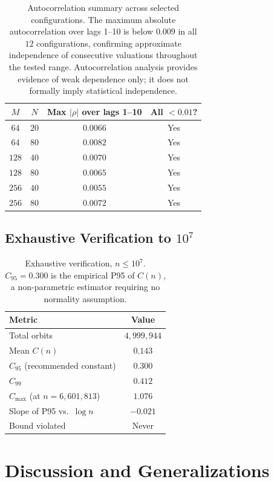 \documentclass[12pt]{article}
\theoremstyle{definition}
\theoremstyle{remark}
\begin{document}
\begin{table}[h]
\centering
\begin{tabular}{cccc}\toprule
$M$&$N$&Max $|\rho|$ over lags 1--10&All $<0.01$?\\\midrule
$64$&$20$&$0.0066$&Yes\\
$64$&$80$&$0.0082$&Yes\\
$128$&$40$&$0.0070$&Yes\\
$128$&$80$&$0.0065$&Yes\\
$256$&$40$&$0.0055$&Yes\\
$256$&$80$&$0.0072$&Yes\\\bottomrule
\end{tabular}
\caption{Autocorrelation summary across selected configurations.
The maximum absolute autocorrelation over lags 1--10 is below $0.009$
in all $12$ configurations, confirming approximate independence
of consecutive valuations throughout the tested range.
Autocorrelation analysis provides evidence of weak dependence
only; it does not formally imply statistical independence.}
\label{tab:autocorr}
\end{table}

\subsection{Exhaustive Verification to $10^7$}

\begin{table}[h]
\centering
\begin{tabular}{lc}\toprule
\textbf{Metric}&\textbf{Value}\\\midrule
Total orbits&$4{,}999{,}944$\\
Mean $C(n)$&$0.143$\\
$C_{95}$ (recommended constant)&$0.300$\\
$C_{99}$&$0.412$\\
$C_{\max}$ (at $n=6{,}601{,}813$)&$1.076$\\
Slope of P95 vs.\ $\log n$&$-0.021$\\
Bound violated&Never\\\bottomrule
\end{tabular}
\caption{Exhaustive verification, $n\leq 10^7$.
$C_{95}=0.300$ is the empirical P95 of $C(n)$, a non-parametric
estimator requiring no normality assumption.}
\label{tab:10M}
\end{table}

\section{Discussion and Generalizations}
\end{document}
